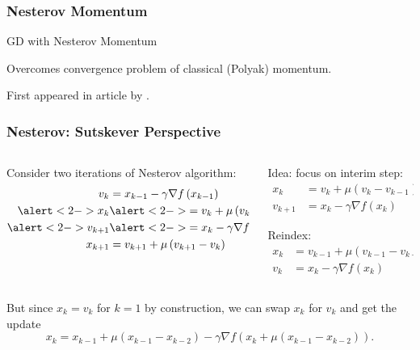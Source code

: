 \documentclass[aspectratio=1610,onlytextwidth]{beamer}
\begin{document}
\begin{frame}[c]
  \frametitle{Nesterov Momentum}
  \begin{algorithm}[H]
    \KwData{$\gamma >0$, $\mu \in [0,1)$}
    \caption{GD with Nesterov Momentum}
  \end{algorithm}

  \bigskip

  Overcomes convergence problem of classical (Polyak) momentum.

  \bigskip

  First appeared in article by \textcite{nesterovMethodSolvingConvex1983}.

\end{frame}

\begin{frame}[c]
  \frametitle{Nesterov: Sutskever Perspective}
  \begin{columns}[T]
    \begin{column}{0.45\textwidth}
      Consider two iterations of Nesterov algorithm:
      \[
        \begin{aligned}
          v_{k}               & = x_{k-1} - \gamma \nabla f\left(x_{k-1} \right)         \\
          \alert<2->{x_{k}}   & \alert<2->{= v_{k} + \mu\left(v_{k} - v_{{k-1}} \right)} \\
          \alert<2->{v_{k+1}} & \alert<2->{= x_{k} - \gamma \nabla f\left(x_{k} \right)} \\
          x_{k+1}             & = v_{k+1} + \mu\left(v_{k+1} - v_{k} \right)
        \end{aligned}
      \]
    \end{column}

    \pause

    \begin{column}{0.45\textwidth}
      Idea: focus on interim step:
      \[
        \begin{aligned}
          x_{k}   & = v_{k} + \mu\left(v_{k} - v_{{k-1}} \right) \\
          v_{k+1} & = x_{k} - \gamma \nabla f\left(x_{k} \right)
        \end{aligned}
      \]

      \pause

      Reindex:
      \[
        \begin{aligned}
          x_{k} & = v_{k-1} + \mu\left(v_{k-1} - v_{{k-2}} \right) \\
          v_{k} & = x_{k} - \gamma \nabla f\left(x_{k} \right)
        \end{aligned}
      \]
    \end{column}

  \end{columns}

  \pause \bigskip

  But since $x_k = v_k$ for $k=1$ by construction, we can swap $x_k$ for $v_k$ and
  get the update
  \[
    x_k = x_{k-1} + \mu(x_{k-1} - x_{k-2}) - \gamma \nabla f(x_{k} + \mu(x_{k-1} - x_{k-2})).
  \]
\end{frame}
\end{document}
